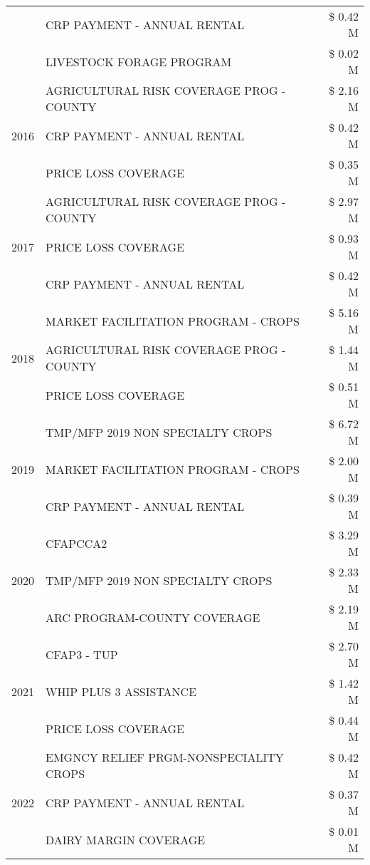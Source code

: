 \begin{tabular}{llr}
 & CRP PAYMENT - ANNUAL RENTAL & \$ 0.42 M \\
 & LIVESTOCK FORAGE PROGRAM & \$ 0.02 M \\
\cline{1-3}
\multirow[t]{3}{*}{2016} & AGRICULTURAL RISK COVERAGE PROG - COUNTY & \$ 2.16 M \\
 & CRP PAYMENT - ANNUAL RENTAL & \$ 0.42 M \\
 & PRICE LOSS COVERAGE & \$ 0.35 M \\
\cline{1-3}
\multirow[t]{3}{*}{2017} & AGRICULTURAL RISK COVERAGE PROG - COUNTY & \$ 2.97 M \\
 & PRICE LOSS COVERAGE & \$ 0.93 M \\
 & CRP PAYMENT - ANNUAL RENTAL & \$ 0.42 M \\
\cline{1-3}
\multirow[t]{3}{*}{2018} & MARKET FACILITATION PROGRAM - CROPS & \$ 5.16 M \\
 & AGRICULTURAL RISK COVERAGE PROG - COUNTY & \$ 1.44 M \\
 & PRICE LOSS COVERAGE & \$ 0.51 M \\
\cline{1-3}
\multirow[t]{3}{*}{2019} & TMP/MFP 2019 NON SPECIALTY CROPS & \$ 6.72 M \\
 & MARKET FACILITATION PROGRAM - CROPS & \$ 2.00 M \\
 & CRP PAYMENT - ANNUAL RENTAL & \$ 0.39 M \\
\cline{1-3}
\multirow[t]{3}{*}{2020} & CFAPCCA2 & \$ 3.29 M \\
 & TMP/MFP 2019 NON SPECIALTY CROPS & \$ 2.33 M \\
 & ARC PROGRAM-COUNTY COVERAGE & \$ 2.19 M \\
\cline{1-3}
\multirow[t]{3}{*}{2021} & CFAP3 - TUP & \$ 2.70 M \\
 & WHIP PLUS 3 ASSISTANCE & \$ 1.42 M \\
 & PRICE LOSS COVERAGE & \$ 0.44 M \\
\cline{1-3}
\multirow[t]{3}{*}{2022} & EMGNCY RELIEF PRGM-NONSPECIALITY CROPS & \$ 0.42 M \\
 & CRP PAYMENT - ANNUAL RENTAL & \$ 0.37 M \\
 & DAIRY MARGIN COVERAGE & \$ 0.01 M \\
\cline{1-3}
\bottomrule
\end{tabular}

